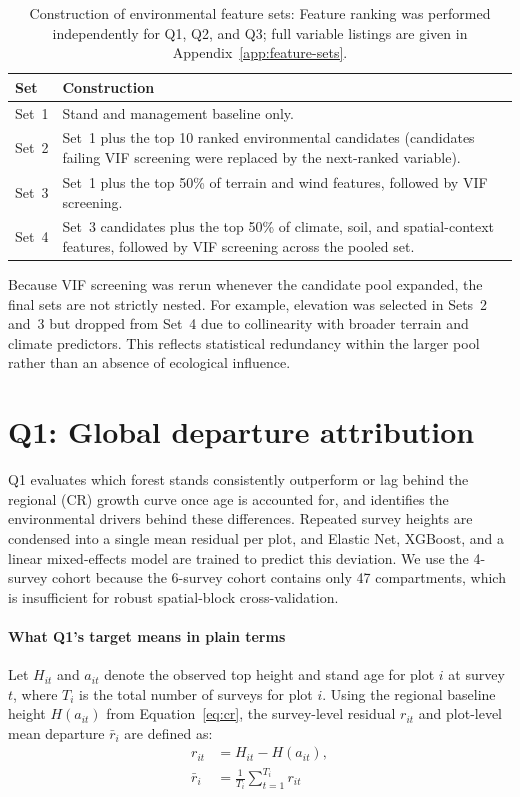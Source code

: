 \documentclass[logo,msc,ai]{infthesis}           %
\begin{document}
\begin{table}[H]
\centering
\footnotesize
\renewcommand{\arraystretch}{1.2}
\begin{tabularx}{\linewidth}{@{}p{1.4cm}X@{}}
\toprule
Set & Construction \\
\midrule
Set~1 & Stand and management baseline only. \\
Set~2 & Set~1 plus the top 10 ranked environmental candidates (candidates failing VIF screening were replaced by the next-ranked variable). \\
Set~3 & Set~1 plus the top 50\% of terrain and wind features, followed by VIF screening. \\
Set~4 & Set~3 candidates plus the top 50\% of climate, soil, and spatial-context features, followed by VIF screening across the pooled set. \\
\bottomrule
\end{tabularx}
\caption{Construction of environmental feature sets: Feature ranking was performed independently for Q1, Q2, and Q3; full variable listings are given in Appendix~\ref{app:feature-sets}.}
\label{tab:feature-sets-construction}
\end{table}

Because VIF screening was rerun whenever the candidate pool expanded, the final sets are not strictly nested. For example, elevation was selected in Sets~2 and~3 but dropped from Set~4 due to collinearity with broader terrain and climate predictors. This reflects statistical redundancy within the larger pool rather than an absence of ecological influence.
\section{Q1: Global departure attribution}
Q1 evaluates which forest stands consistently outperform or lag behind the regional (CR) growth curve once age is accounted for, and identifies the environmental drivers behind these differences. Repeated survey heights are condensed into a single mean residual per plot, and Elastic Net, XGBoost, and a linear mixed-effects model are trained to predict this deviation. We use the 4-survey cohort because the 6-survey cohort contains only 47 compartments, which is insufficient for robust spatial-block cross-validation.

\paragraph*{What Q1's target means in plain terms}
Let $H_{it}$ and $a_{it}$ denote the observed top height and stand age for plot $i$ at survey $t$, where $T_i$ is the total number of surveys for plot $i$. Using the regional baseline height $H(a_{it})$ from Equation~\eqref{eq:cr}, the survey-level residual $r_{it}$ and plot-level mean departure $\bar{r}_i$ are defined as:
\begin{align}
r_{it} &= H_{it} - H(a_{it}), \label{eq:cr-gap} \\
\bar{r}_i &= \frac{1}{T_i} \sum_{t=1}^{T_i} r_{it} \label{eq:mean-cr-residual}
\end{align}
\end{document}
